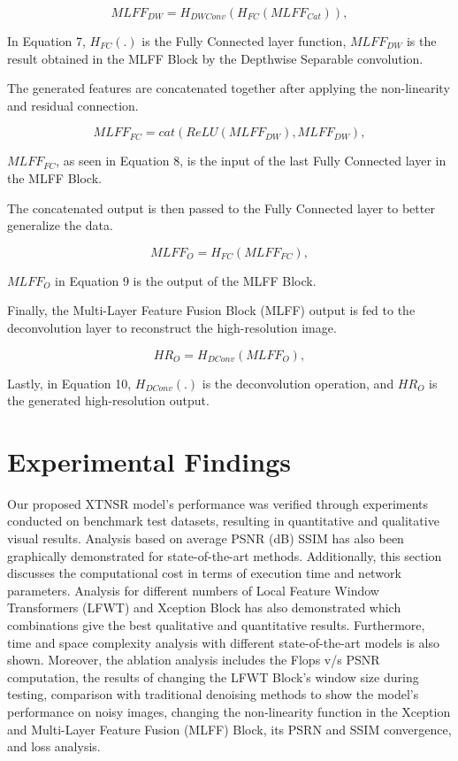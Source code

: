 \documentclass[twocolumn]{svjour3}          %
\begin{document}
\begin{equation}
{MLFF_{DW}}= {H_{DWConv}}({H_{FC}}({MLFF_{Cat}})),
\end{equation}

In Equation 7, ${H_{FC}}$$(.)$ is the Fully Connected layer function, ${MLFF_{DW}}$ is the result obtained in the MLFF Block by the Depthwise Separable convolution.

The generated features are concatenated together after applying the non-linearity and residual connection.

\begin{equation}
{MLFF_{FC}}= {cat}({ReLU}({MLFF_{DW}}), {MLFF_{DW}}),
\end{equation}

${MLFF_{FC}}$, as seen in Equation 8, is the input of the last Fully Connected layer in the MLFF Block.

The concatenated output is then passed to the Fully Connected layer to better generalize the data.

\begin{equation}
{MLFF_{O}}= {H_{FC}}({MLFF_{FC}}),
\end{equation}

${MLFF_{O}}$ in Equation 9 is the output of the MLFF Block.

Finally, the Multi-Layer Feature Fusion Block (MLFF) output is fed to the deconvolution layer to reconstruct the high-resolution image.

\begin{equation}
{HR_{O}}= {H_{DConv}}({MLFF_{O}}),
\end{equation}

Lastly, in Equation 10, ${H_{DConv}}$$(.)$ is the deconvolution operation, and ${HR_{O}}$ is the generated high-resolution output.

\section{Experimental Findings}

Our proposed XTNSR model's performance was verified through experiments conducted on benchmark test datasets, resulting in quantitative and qualitative visual results. Analysis based on average PSNR (dB) SSIM has also been graphically demonstrated for state-of-the-art methods. Additionally, this section discusses the computational cost in terms of execution time and network parameters. Analysis for different numbers of Local Feature Window Transformers (LFWT) and Xception Block has also demonstrated which combinations give the best qualitative and quantitative results. Furthermore, time and space complexity analysis with different state-of-the-art models is also shown. Moreover, the ablation analysis includes the Flops v/s PSNR computation, the results of changing the LFWT Block's window size during testing, comparison with traditional denoising methods to show the model's performance on noisy images,  changing the non-linearity function in the Xception and Multi-Layer Feature Fusion (MLFF) Block, its PSRN and SSIM convergence, and loss analysis. 
\end{document}
